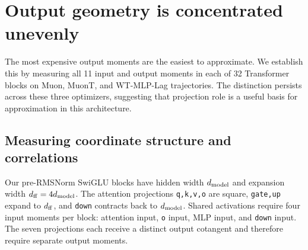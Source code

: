 \section{Output geometry is concentrated unevenly}
\label{sec:diagnosis}

The most expensive output moments are the easiest to approximate. We establish this by measuring all 11 input and output moments in each of 32 Transformer blocks on Muon, MuonT, and WT-MLP-Lag trajectories. The distinction persists across these three optimizers, suggesting that projection role is a useful basis for approximation in this architecture.

\subsection{Measuring coordinate structure and correlations}
\label{sec:diagnosis_setup}

Our pre-RMSNorm SwiGLU blocks have hidden width $d_{\mathrm{model}}$ and expansion width $d_{\mathrm{ff}}=4d_{\mathrm{model}}$. The attention projections \texttt{q,k,v,o} are square, \texttt{gate,up} expand to $d_{\mathrm{ff}}$, and \texttt{down} contracts back to $d_{\mathrm{model}}$. Shared activations require four input moments per block: attention input, \texttt{o} input, MLP input, and \texttt{down} input. The seven projections each receive a distinct output cotangent and therefore require separate output moments.

